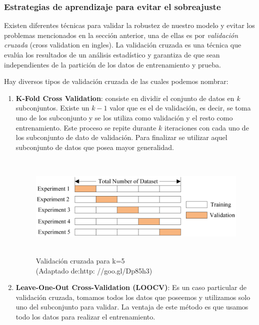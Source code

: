 \subsubsection{Estrategias de aprendizaje para evitar el sobreajuste}
Existen diferentes técnicas para validar la robustez de nuestro modelo y evitar los problemas mencionados en la sección anterior, una de ellas es por  \textit{validación cruzada} (cross validation en ingles). La validación cruzada es una técnica que evalúa los resultados de un análisis estadístico y garantiza de que sean independientes de la partición de los datos de entrenamiento y prueba. 

Hay diversos tipos de validación cruzada de las cuales podemos nombrar:

\begin{enumerate}

\item \textbf{K-Fold Cross Validation}: consiste en dividir el conjunto de datos en \textit{k} subconjuntos. Existe un $k-1 $ valor que es el de validación, es decir, se toma uno de los subconjunto y se los utiliza como validación y el resto como entrenamiento.  Este proceso se repite durante $k $ iteraciones con cada uno de los subconjunto de dato de validación. Para finalizar se utilizar aquel subconjunto de datos que posea mayor generalidad.
\begin{figure}[H]
 \centering
  \includegraphics[height=5cm,keepaspectratio=true,clip=true]{imagenes/MarcoTeorico/crossvalidat.png}
  \caption{Validación cruzada para k=5\\(Adaptado de:{http: //goo.gl/Dp85h3})}
	\label{Fig: crossvalidation}
\end{figure}

\item \textbf{Leave-One-Out Cross-Validation (LOOCV)}: Es un caso particular de validación cruzada, tomamos todos los datos que poseemos y utilizamos solo uno del subconjunto para validar. La ventaja de este método es que usamos todo los datos para realizar el entrenamiento.


\end{enumerate}
